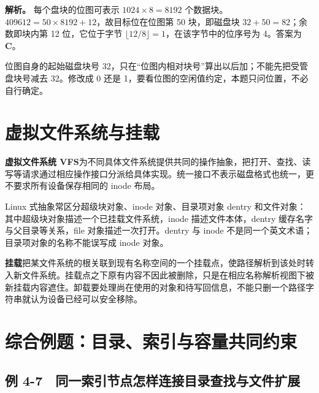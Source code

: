 \textbf{解析。} 每个盘块的位图可表示 \(1024\times8=8192\) 个数据块。\(409612=50\times8192+12\)，故目标位在位图第 50 块，即磁盘块 \(32+50=82\)；余数即块内第 12 位，它位于字节 \(\lfloor12/8\rfloor=1\)，在该字节中的位序号为 4。答案为 \textbf{C}。

位图自身的起始磁盘块号 32，只在``位图内相对块号''算出以后加；不能先把受管盘块号减去 32。修改成 0 还是 1，要看位图的空闲值约定，本题只问位置，不必自行确定。

\section{虚拟文件系统与挂载}\label{OS04-6-10}

\textbf{虚拟文件系统 VFS}为不同具体文件系统提供共同的操作抽象，把打开、查找、读写等请求通过相应操作接口分派给具体实现。统一接口不表示磁盘格式也统一，更不要求所有设备保存相同的 inode 布局。

Linux 式抽象常区分超级块对象、inode 对象、目录项对象 dentry 和文件对象：其中超级块对象描述一个已挂载文件系统，inode 描述文件本体，dentry 缓存名字与父目录等关系，file 对象描述一次打开。dentry 与 inode 不是同一个英文术语；目录项对象的名称不能误写成 inode 对象。

\textbf{挂载}把某文件系统的根关联到现有名称空间的一个挂载点，使路径解析到该处时转入新文件系统。挂载点之下原有内容不因此被删除，只是在相应名称解析视图下被新挂载内容遮住。卸载要处理尚在使用的对象和待写回信息，不能只删一个路径字符串就认为设备已经可以安全移除。

\section{综合例题：目录、索引与容量共同约束}\label{OS04-6-11}

\subsection{例 4-7　同一索引节点怎样连接目录查找与文件扩展}\label{OS04-ex6-7}

